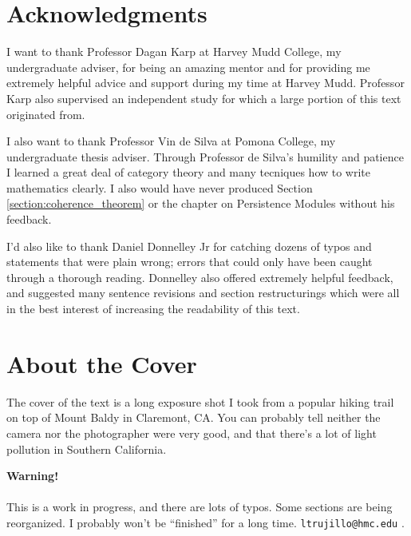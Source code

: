 \begin{spacing}{1}
\linespread{1}



\newpage
\section*{Acknowledgments}
I want to thank Professor Dagan Karp at Harvey Mudd College, my undergraduate adviser, for being an amazing 
mentor and for providing me extremely helpful advice and support during my time at Harvey Mudd.
Professor Karp also supervised an independent study for which a large portion of this text originated from.

I also want to thank Professor Vin de Silva at Pomona College, my undergraduate thesis adviser.
Through Professor de Silva's humility and patience I learned a great deal of category theory and many tecniques
how to write mathematics clearly. I also would have never produced Section \ref{section:coherence_theorem}
or the chapter on Persistence Modules without his feedback.

I'd also like to thank Daniel Donnelley Jr for catching dozens of typos and 
statements that were plain wrong; errors that could only have been caught 
through a thorough reading. Donnelley also offered extremely helpful feedback, and
suggested many sentence revisions and section restructurings which were all 
in the best interest of increasing the readability of this text.  

\section*{About the Cover}
The cover of the text is a long exposure shot I took from a popular 
hiking trail on top of Mount Baldy in Claremont, CA. You can probably 
tell neither the camera nor the photographer were very good, and that there's a lot 
of light pollution in Southern California. 


\newpage
{\centering \huge\textbf{Warning!}}
\\
\\

This is a work in progress, and there are lots of typos. Some sections 
are being reorganized. I probably won't be ``finished'' for a long time.
\texttt{ltrujillo@hmc.edu} .


\end{spacing}
